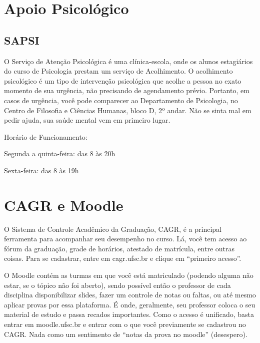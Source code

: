\documentclass{article}
\begin{document}
\section{Apoio Psicológico}
\subsection{SAPSI}
O Serviço de Atenção Psicológica é uma clínica-escola, onde os alunos estagiários do curso de Psicologia  prestam um serviço de Acolhimento. O acolhimento psicológico é um tipo de intervenção psicológica que acolhe a pessoa no exato momento de sua urgência, não precisando de agendamento prévio. Portanto, em casos de urgência, você pode comparecer ao Departamento de Psicologia, no Centro de Filosofia e Ciências Humanas, bloco D, 2º andar. Não se sinta mal em pedir ajuda, sua saúde mental vem em primeiro lugar.

Horário de Funcionamento:


Segunda a quinta-feira: das 8 às 20h

Sexta-feira: das 8 às 19h
\section{CAGR e Moodle}

O Sistema de Controle Acadêmico da Graduação, CAGR, é a principal ferramenta para acompanhar seu desempenho no curso. Lá, você tem acesso ao fórum da graduação, grade de horários, atestado de matrícula, entre outras coisas. Para se cadastrar, entre em cagr.ufsc.br e clique em “primeiro acesso”.

O Moodle contém as turmas em que você está matriculado (podendo alguma não estar, se o tópico não foi aberto), sendo possível então o professor de cada disciplina disponibilizar slides, fazer um controle de notas ou faltas, ou até mesmo aplicar provas por essa plataforma. É onde, geralmente, seu professor coloca o seu material de estudo e passa recados importantes. Como o acesso é unificado, basta entrar em moodle.ufsc.br e entrar com o que você previamente se cadastrou no CAGR. Nada como um sentimento de “notas da prova no moodle” (desespero).
\end{document}
